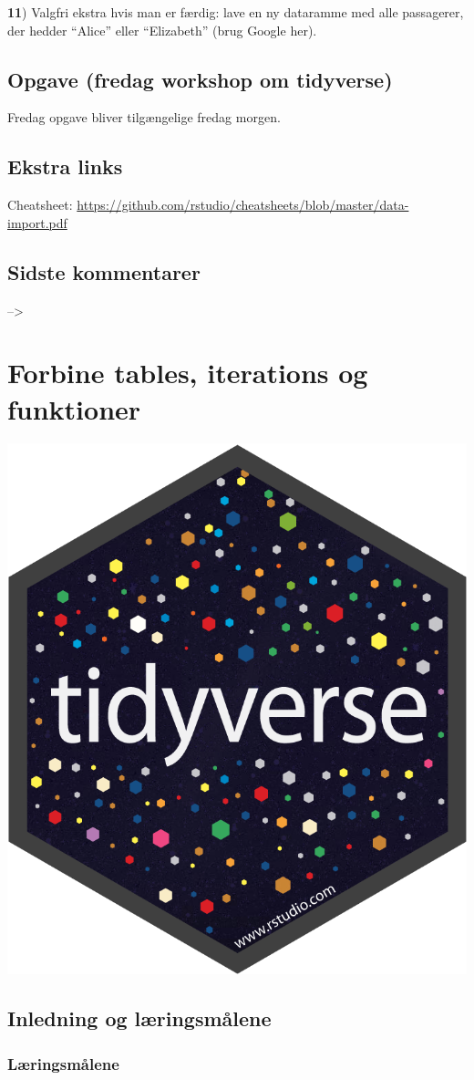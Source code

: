 \documentclass[
]{book}
\begin{document}
\textbf{11}) Valgfri ekstra hvis man er færdig: lave en ny dataramme med alle passagerer, der hedder ``Alice'' eller ``Elizabeth'' (brug Google her).

\hypertarget{opgave-fredag-workshop-om-tidyverse}{%
\section{Opgave (fredag workshop om tidyverse)}\label{opgave-fredag-workshop-om-tidyverse}}

Fredag opgave bliver tilgængelige fredag morgen.

\hypertarget{ekstra-links-2}{%
\section{Ekstra links}\label{ekstra-links-2}}

Cheatsheet: \url{https://github.com/rstudio/cheatsheets/blob/master/data-import.pdf}

\hypertarget{sidste-kommentarer}{%
\section{Sidste kommentarer}\label{sidste-kommentarer}}

--\textgreater{}

\hypertarget{forbine-tables-iterations-og-funktioner}{%
\chapter{Forbine tables, iterations og funktioner}\label{forbine-tables-iterations-og-funktioner}}

\includegraphics[width=0.15\linewidth]{plots/hex-tidyverse}

\hypertarget{inledning-og-luxe6ringsmuxe5lene-1}{%
\section{Inledning og læringsmålene}\label{inledning-og-luxe6ringsmuxe5lene-1}}

\hypertarget{luxe6ringsmuxe5lene-2}{%
\subsection{Læringsmålene}\label{luxe6ringsmuxe5lene-2}}
\end{document}
